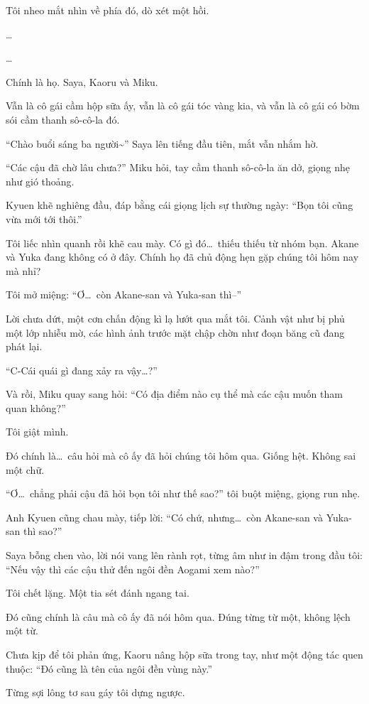 \documentclass[../main.tex]{subfiles}
\begin{document}
Tôi nheo mắt nhìn về phía đó, dò xét một hồi.

\dots

\dots

Chính là họ. Saya, Kaoru và Miku.

Vẫn là cô gái cầm hộp sữa ấy, vẫn là cô gái tóc vàng kia, và vẫn là cô gái có bờm sói cầm thanh sô-cô-la đó.


``Chào buổi sáng ba người\~{}'' Saya lên tiếng đầu tiên, mắt vẫn nhắm hờ.

``Các cậu đã chờ lâu chưa?'' Miku hỏi, tay cầm thanh sô-cô-la ăn dở, giọng nhẹ như gió thoảng.

Kyuen khẽ nghiêng đầu, đáp bằng cái giọng lịch sự thường ngày: ``Bọn tôi cũng vừa mới tới thôi.''

Tôi liếc nhìn quanh rồi khẽ cau mày. Có gì đó\dots\ thiếu thiếu từ nhóm bạn. Akane và Yuka đang không có ở đây. Chính họ đã chủ động hẹn gặp chúng tôi hôm nay mà nhỉ?

Tôi mở miệng: ``Ơ\dots\ còn Akane-san và Yuka-san thì--''

Lời chưa dứt, một cơn chấn động kì lạ lướt qua mắt tôi. Cảnh vật như bị phủ một lớp nhiễu mờ, các hình ảnh trước mặt chập chờn như đoạn băng cũ đang phát lại.

``C-Cái quái gì đang xảy ra vậy\dots?''

Và rồi, Miku quay sang hỏi: ``Có địa điểm nào cụ thể mà các cậu muốn tham quan không?''

Tôi giật mình.

Đó chính là\dots\ câu hỏi mà cô ấy đã hỏi chúng tôi hôm qua. Giống hệt. Không sai một chữ.

``Ơ\dots\ chẳng phải cậu đã hỏi bọn tôi như thế sao?'' tôi buột miệng, giọng run nhẹ.

Anh Kyuen cũng chau mày, tiếp lời: ``Có chứ, nhưng\dots\ còn Akane-san và Yuka-san thì sao?''

Saya bỗng chen vào, lời nói vang lên rành rọt, từng âm như in đậm trong đầu tôi: ``Nếu vậy thì các cậu thử đến ngôi đền Aogami xem nào?''

Tôi chết lặng. Một tia sét đánh ngang tai.

Đó cũng chính là câu mà cô ấy đã nói hôm qua. Đúng từng từ một, không lệch một từ.

Chưa kịp để tôi phản ứng, Kaoru nâng hộp sữa trong tay, như một động tác quen thuộc: ``Đó cũng là tên của ngôi đền vùng này.''

Từng sợi lông tơ sau gáy tôi dựng ngược.
\end{document}
